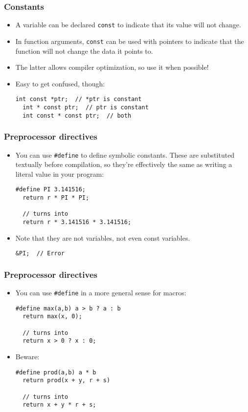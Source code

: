 \begin{frame}[fragile]
  \frametitle{Constants}
  \begin{itemize}
  \item A variable can be declared \texttt{const} to indicate that its value
    will not change.
  \item In function arguments, \texttt{const} can be used with pointers to
    indicate that the function will not change the data it points to.
  \item The latter allows compiler optimization, so use it when possible!
  \item Easy to get confused, though:
\begin{lstlisting}[style=c]
  int const *ptr;  // *ptr is constant
  int * const ptr;  // ptr is constant
  int const * const ptr;  // both
\end{lstlisting}
  \end{itemize}
\end{frame}

\begin{frame}[fragile]
  \frametitle{Preprocessor directives}
  \begin{itemize}
  \item You can use \texttt{\#define} to define symbolic constants. These are
    substituted textually before compilation, so they're effectively the same as
    writing a literal value in your program:
\begin{lstlisting}[style=c]
  #define PI 3.141516;
  return r * PI * PI;

  // turns into
  return r * 3.141516 * 3.141516;
\end{lstlisting}
  \item Note that they are not variables, not even const variables.
\begin{lstlisting}[style=c]
  &PI;  // Error
\end{lstlisting}
  \end{itemize}
\end{frame}

\begin{frame}[fragile]
  \frametitle{Preprocessor directives}
  \begin{itemize}
  \item You can use \texttt{\#define} in a more general sense for macros:
\begin{lstlisting}[style=c]
  #define max(a,b) a > b ? a : b
  return max(x, 0);

  // turns into
  return x > 0 ? x : 0;
\end{lstlisting}
  \item Beware:
\begin{lstlisting}[style=c]
  #define prod(a,b) a * b
  return prod(x + y, r + s)

  // turns into
  return x + y * r + s;
\end{lstlisting}
  \end{itemize}
\end{frame}

